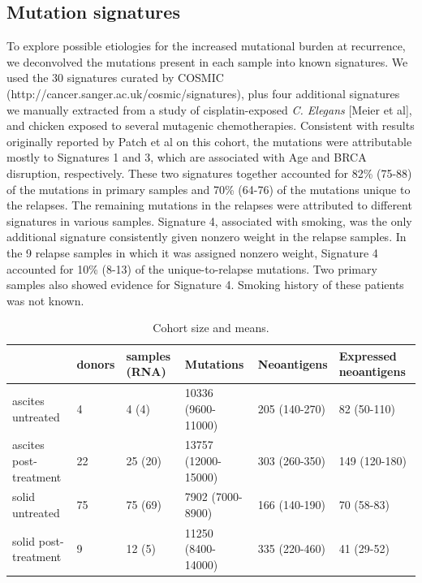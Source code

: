 \subsection*{Mutation signatures}
To explore possible etiologies for the increased mutational burden at recurrence, we deconvolved the mutations present in each sample into known signatures. We used the 30 signatures curated by COSMIC (http://cancer.sanger.ac.uk/cosmic/signatures), plus four additional signatures we manually extracted from a study of cisplatin-exposed \textit{C. Elegans} [Meier et al], and chicken exposed to several mutagenic chemotherapies. Consistent with results originally reported by Patch et al on this cohort, the mutations were attributable mostly to Signatures 1 and 3, which are associated with Age and BRCA disruption, respectively. These two signatures together accounted for 82\% (75-88) of the mutations in primary samples and 70\% (64-76) of the mutations unique to the relapses. The remaining mutations in the relapses were attributed to different signatures in various samples. Signature 4, associated with smoking, was the only additional signature consistently given nonzero weight in the relapse samples. In the 9 relapse samples in which it was assigned nonzero weight, Signature 4 accounted for 10\% (8-13) of the unique-to-relapse mutations. Two primary samples also showed evidence for Signature 4. Smoking history of these patients was not known.



\begin{table}
\begin{tabular}{llllll}
\toprule
{} & donors & samples (RNA) &            Mutations &    Neoantigens & Expressed neoantigens \\
\midrule
ascites untreated      &      4 &         4 (4) &   10336 (9600-11000) &  205 (140-270) &           82 (50-110) \\
ascites post-treatment &     22 &       25 (20) &  13757 (12000-15000) &  303 (260-350) &         149 (120-180) \\
solid untreated        &     75 &       75 (69) &     7902 (7000-8900) &  166 (140-190) &            70 (58-83) \\
solid post-treatment   &      9 &        12 (5) &   11250 (8400-14000) &  335 (220-460) &            41 (29-52) \\
\bottomrule
\end{tabular}

\caption{Cohort size and means.}
\label{tab:cohort}
\end{table}

